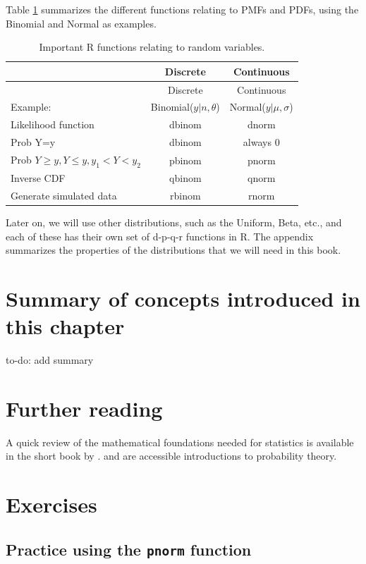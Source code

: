\documentclass[12pt,]{krantz}
\makeatletter
\newenvironment{kframe}{%
\medskip{}
\setlength{\fboxsep}{.8em}
 \def\at@end@of@kframe{}%
 \ifinner\ifhmode%
  \def\at@end@of@kframe{\end{minipage}}%
  \begin{minipage}{\columnwidth}%
 \fi\fi%
 \def\FrameCommand##1{\hskip\@totalleftmargin \hskip-\fboxsep
 \colorbox{shadecolor}{##1}\hskip-\fboxsep
     \hskip-\linewidth \hskip-\@totalleftmargin \hskip\columnwidth}%
 \MakeFramed {\advance\hsize-\width
   \@totalleftmargin\z@ \linewidth\hsize
   \@setminipage}}%
 {\par\unskip\endMakeFramed%
 \at@end@of@kframe}
\newenvironment{rmdblock}[1]
  {
  \begin{itemize}
  \renewcommand{\labelitemi}{
    \raisebox{-.7\height}[0pt][0pt]{
      {\setkeys{Gin}{width=3em,keepaspectratio}\texttt{[image: images/\#1]}}
    }
  }
  \setlength{\fboxsep}{1em}
  \begin{kframe}
  \item
  }
  {
  \end{kframe}
  \end{itemize}
  }
\newenvironment{rmdnote}
  {\begin{rmdblock}{note}}
  {\end{rmdblock}}
\theoremstyle{definition}
\theoremstyle{definition}
\theoremstyle{definition}
\theoremstyle{remark}
\makeatother
\begin{document}
Table \ref{tab:dpqrfunctions} summarizes the different functions
relating to PMFs and PDFs, using the Binomial and Normal as examples.

\begin{longtable}[]{@{}lcc@{}}
\caption{\label{tab:dpqrfunctions} Important R functions relating to random
variables.}\tabularnewline
\toprule
& Discrete & Continuous\tabularnewline
\midrule
\endfirsthead
\toprule
& Discrete & Continuous\tabularnewline
\midrule
\endhead
Example: & Binomial(\(y|n,\theta\)) &
Normal(\(y|\mu,\sigma\))\tabularnewline
Likelihood function & dbinom & dnorm\tabularnewline
Prob Y=y & dbinom & always 0\tabularnewline
Prob \(Y\geq y, Y\leq y, y_1<Y<y_2\) & pbinom & pnorm\tabularnewline
Inverse CDF & qbinom & qnorm\tabularnewline
Generate simulated data & rbinom & rnorm\tabularnewline
\bottomrule
\end{longtable}

Later on, we will use other distributions, such as the Uniform, Beta,
etc., and each of these has their own set of d-p-q-r functions in R. The
appendix summarizes the properties of the distributions that we will
need in this book.

\section{Summary of concepts introduced in this
chapter}\label{summary-of-concepts-introduced-in-this-chapter}
\begin{rmdnote} to-do: add summary \end{rmdnote}
\section{Further reading}\label{further-reading}

A quick review of the mathematical foundations needed for statistics is
available in the short book by \citet{fox2009mathematical}.
\citet{morin2016probability} and \citet{blitzstein2014introduction} are
accessible introductions to probability theory.

\section{Exercises}\label{exercises}

\subsection{\texorpdfstring{Practice using the \texttt{pnorm}
function}{Practice using the pnorm function}}\label{practice-using-the-pnorm-function}
\end{document}
